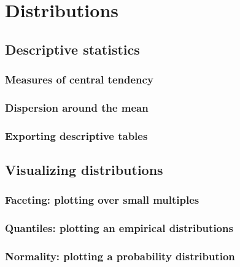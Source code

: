 \chapter{Distributions}%
	\label{ch:distr}%


	\minitoc
	\newpage
	
%
%
%
\section{Descriptive statistics}

	\subsection{Measures of central tendency}

	\subsection{Dispersion around the mean}

	\subsection{Exporting descriptive tables}




%
%
%
\section{Visualizing distributions}

	\subsection{Faceting: plotting over small multiples}

	\subsection{Quantiles: plotting an empirical distributions}

	\subsection{Normality: plotting a probability distribution}

